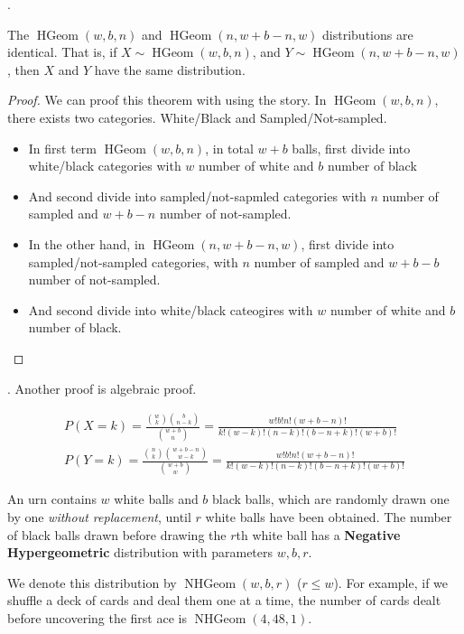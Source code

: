 \documentclass[8pt]{beamer}
\newcommand{\tb}[1]{\textbf{#1}}
\newcommand{\ti}[1]{\textit{#1}}
\newcommand{\HGeom}[3]{\operatorname{HGeom}\!\left(#1, #2, #3\right)}
\newcommand{\NHGeom}[3]{\operatorname{NHGeom}\!\left(#1,#2, #3\right)}
\begin{document}
\begin{frame}{.}
    \begin{theorem}
        The $\HGeom{w}{b}{n}$ and $\HGeom{n}{w+b-n}{w}$ distributions are identical. That is, if $X \sim \HGeom{w}{b}{n}$, and $Y \sim \HGeom{n}{w+b-n}{w}$, then $X$ and $Y$ have the same distribution.
    \end{theorem}
    \begin{proof}
        We can proof this theorem with using the story. In $\HGeom{w}{b}{n}$, there exists two categories. White/Black and Sampled/Not-sampled. 
        \begin{itemize}
            \item  In first term $\HGeom{w}{b}{n}$, in total $w+b$ balls, first divide into white/black categories with $w$ number of white and $b$ number of black
            \item And second divide into sampled/not-sapmled categories with $n$ number of sampled and $w+b-n$ number of not-sampled.
            \item In the other hand, in $\HGeom{n}{w+b-n}{w}$, first divide into sampled/not-sampled categories, with $n$ number of sampled and $w+b-b$ number of not-sampled.
            \item And second divide into white/black cateogires with $w$ number of white and $b$ number of black.
        \end{itemize}
    \end{proof}
\end{frame}

\begin{frame}{.}
    Another proof is algebraic proof.

     \[
        \begin{gathered}
            P(X=k) = \frac{\binom{w}{k}\binom{b}{n-k}}{\binom{w+b}{n}} = \frac{w!b! n! (w+b-n)!}{k! (w-k)! (n-k)! (b-n+k)! (w+b)!} \\
            P(Y=k) = \frac{\binom{n}{k}\binom{w+b-n}{w-k}}{\binom{w+b}{w}} = \frac{w!b! n! (w+b-n)!}{k! (w-k)! (n-k)! (b-n+k)! (w+b)!}
        \end{gathered}
    \]

    \begin{definition}
        An urn contains $w$ white balls and $b$ black balls, which are randomly drawn one by one \ti{without replacement}, until $r$ white balls have been obtained. 
        The number of black balls drawn before drawing the $r$th white ball has a \tb{Negative Hypergeometric} distribution with parameters $w, b, r$.

        We denote this distribution by $\NHGeom{w}{b}{r}$ ($r \leq w$).
        For example, if we shuffle a deck of cards and deal them one at a time, the number of cards dealt before uncovering the first ace is $\NHGeom{4}{48}{1}$.
    \end{definition}
\end{frame}
\end{document}
